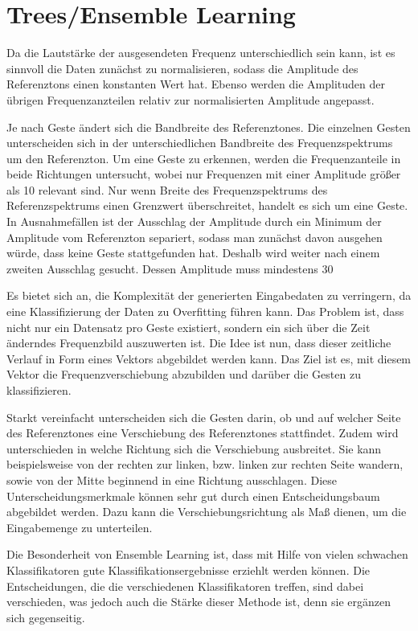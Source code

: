 \section{Trees/Ensemble Learning}

Da die Lautstärke der ausgesendeten Frequenz unterschiedlich sein kann, ist es sinnvoll die Daten 
zunächst zu normalisieren, sodass die Amplitude des Referenztons einen konstanten Wert hat. Ebenso 
werden die Amplituden der übrigen Frequenzanzteilen relativ zur normalisierten Amplitude angepasst.

Je nach Geste ändert sich die Bandbreite des Referenztones.
Die einzelnen Gesten unterscheiden sich in der unterschiedlichen Bandbreite des Frequenzspektrums 
um den Referenzton. Um eine Geste zu erkennen, werden die Frequenzanteile in beide Richtungen 
untersucht, wobei nur Frequenzen mit einer Amplitude größer als 10%
relevant sind. Nur wenn Breite des Frequenzspektrums des Referenzspektrums einen Grenzwert 
überschreitet, handelt es sich um eine Geste. In Ausnahmefällen ist der Ausschlag der Amplitude 
durch ein Minimum der Amplitude vom Referenzton separiert, sodass man zunächst davon ausgehen würde, 
dass keine Geste stattgefunden hat. Deshalb wird weiter nach einem zweiten Ausschlag gesucht. Dessen 
Amplitude muss mindestens 30%

Es bietet sich an, die Komplexität der generierten Eingabedaten zu verringern, da eine Klassifizierung 
der Daten zu Overfitting führen kann. 
Das Problem ist, dass nicht nur ein Datensatz pro Geste existiert, sondern ein sich über die Zeit änderndes 
Frequenzbild auszuwerten ist. 
Die Idee ist nun, dass dieser zeitliche Verlauf in Form eines Vektors abgebildet werden kann. Das Ziel ist es,
mit diesem Vektor die Frequenzverschiebung abzubilden und darüber die Gesten zu klassifizieren. 

Starkt vereinfacht unterscheiden sich die Gesten darin, ob und auf welcher Seite des Referenztones eine 
Verschiebung des Referenztones stattfindet. 
Zudem wird unterschieden in welche Richtung sich die Verschiebung ausbreitet. Sie kann beispielsweise von 
der rechten zur linken, bzw. linken zur rechten Seite wandern, sowie von der Mitte beginnend in eine 
Richtung ausschlagen.
Diese Unterscheidungsmerkmale können sehr gut durch einen Entscheidungsbaum abgebildet werden. Dazu kann 
die Verschiebungsrichtung als Maß dienen, um die Eingabemenge zu unterteilen. 

Die Besonderheit von Ensemble Learning ist, dass mit Hilfe von vielen schwachen Klassifikatoren 
gute Klassifikationsergebnisse erziehlt werden können. Die Entscheidungen, die die verschiedenen 
Klassifikatoren treffen, sind dabei verschieden, was jedoch auch die Stärke dieser Methode ist, 
denn sie ergänzen sich gegenseitig. 





